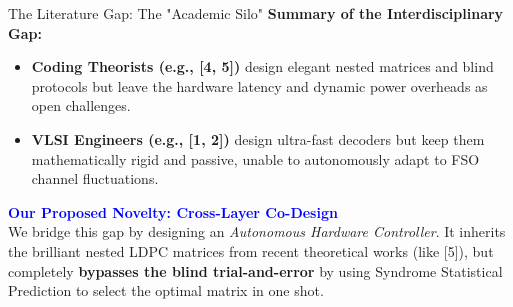 \documentclass[t, aspectratio=169]{beamer}
\begin{document}
	\begin{frame}{The Literature Gap: The "Academic Silo"}
        \textbf{Summary of the Interdisciplinary Gap:}
        \begin{itemize}
            \item \textbf{Coding Theorists (e.g., [4, 5])} design elegant nested matrices and blind protocols but leave the hardware latency and dynamic power overheads as open challenges.
            \item \textbf{VLSI Engineers (e.g., [1, 2])} design ultra-fast decoders but keep them mathematically rigid and passive, unable to autonomously adapt to FSO channel fluctuations.
        \end{itemize}
        \vspace{1em}
        \textbf{\textcolor{blue}{Our Proposed Novelty: Cross-Layer Co-Design}} \\
        We bridge this gap by designing an \textit{Autonomous Hardware Controller}. It inherits the brilliant nested LDPC matrices from recent theoretical works (like [5]), but completely \textbf{bypasses the blind trial-and-error} by using Syndrome Statistical Prediction to select the optimal matrix in one shot.
	\end{frame}
\end{document}
